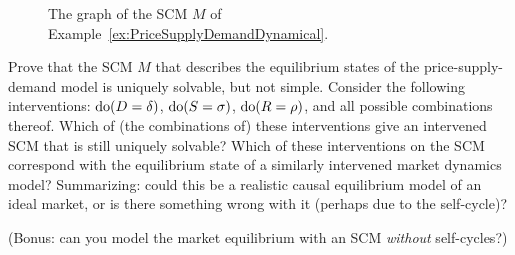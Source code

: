 \begin{Eg}
\begin{figure}

  \caption{The graph of the SCM $M$ of Example~\ref{ex:PriceSupplyDemandDynamical}.}
   \label{fig:PriceSupplyDemand}
\end{figure}

\end{Eg}

\begin{Exc}
  Prove that the SCM $M$ that describes the equilibrium states of the price-supply-demand model is uniquely solvable, but not simple. 
  Consider the following interventions: $\operatorname{do}(D=\delta)$, $\operatorname{do}(S=\sigma)$, $\operatorname{do}(R=\rho)$, and all possible combinations thereof. Which of (the combinations of) these interventions give an intervened SCM that is still uniquely solvable?
  Which of these interventions on the SCM correspond with the equilibrium state of a similarly intervened market dynamics model?
  Summarizing: could this be a realistic causal equilibrium model of an ideal market, or is there something wrong with it (perhaps due to the self-cycle)?

  (Bonus: can you model the market equilibrium with an SCM \emph{without} self-cycles?)
\end{Exc}

